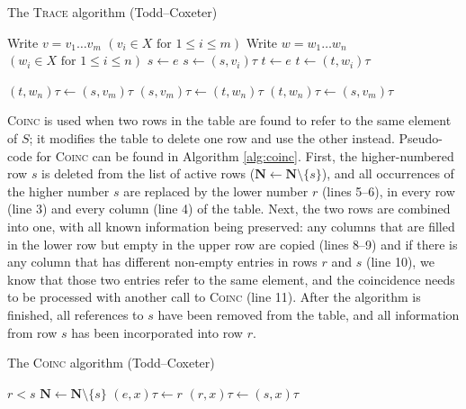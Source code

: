 \begin{algorithm}
\caption{The \textsc{Trace} algorithm (Todd--Coxeter)}
\label{alg:trace}
\begin{algorithmic}[1]
\State Write $v = v_1 \ldots v_m$ \Comment $(v_i \in X \text{~for~} 1 \leq i \leq m)$
\State Write $w = w_1 \ldots w_n$ \Comment $(w_i \in X \text{~for~} 1 \leq i \leq n)$
\State $s \gets e$
    \State {}
  \EndIf
  \State $s \gets (s, v_i)\tau$
\EndFor
\State $t \gets e$
    \State {}
  \EndIf
  \State $t \gets (t, w_i)\tau$
\EndFor

  \State {}
  \State $(t, w_n)\tau \gets (s, v_m)\tau$
  \State $(s, v_m)\tau \gets (t, w_n)\tau$
  \State $(t, w_n)\tau \gets (s, v_m)\tau$
  \State {}
\EndIf

\EndProcedure
\end{algorithmic}
\end{algorithm}

\textsc{Coinc} is used when two rows in the table are found to refer to the same
element of $S$; it modifies the table to delete one row and use the other
instead.  Pseudo-code for \textsc{Coinc} can be found in Algorithm
\ref{alg:coinc}.  First, the higher-numbered row $s$ is deleted from the list of
active rows ($\mathbf{N} \gets \mathbf{N} \setminus \{s\}$), and all occurrences
of the higher number $s$ are replaced by the lower number $r$ (lines 5--6), in
every row (line 3) and every column (line 4) of the table.  Next, the two rows
are combined into one, with all known information being preserved: any columns
that are filled in the lower row but empty in the upper row are copied (lines
8--9) and if there is any column that has different non-empty entries in rows
$r$ and $s$ (line 10), we know that those two entries refer to the same element,
and the coincidence needs to be processed with another call to \textsc{Coinc}
(line 11).  After the algorithm is finished, all references to $s$ have been
removed from the table, and all information from row $s$ has been incorporated
into row $r$.

\begin{algorithm}
\caption{The \textsc{Coinc} algorithm (Todd--Coxeter)}
\label{alg:coinc}
\begin{algorithmic}[1]
\Require $r < s$
\State $\mathbf{N} \gets \mathbf{N} \setminus \{s\}$
      \State $(e, x)\tau \gets r$
    \EndIf
  \EndFor
\EndFor
{}
    \State $(r, x)\tau \gets (s, x)\tau$
    \State {}
  \EndIf
\EndFor
\EndProcedure
\end{algorithmic}
\end{algorithm}

